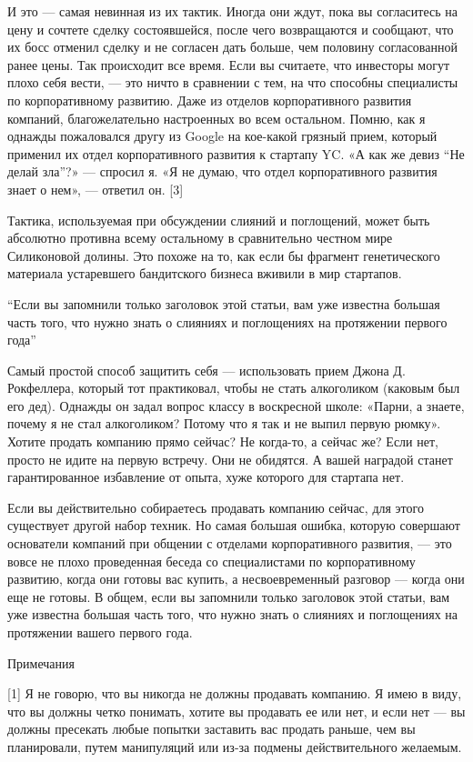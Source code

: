 \documentclass[ebook,12pt,oneside,openany]{memoir}
\begin{document}
И это — самая невинная из их тактик. Иногда они ждут, пока вы
согласитесь на цену и сочтете сделку состоявшейся, после чего
возвращаются и сообщают, что их босс отменил сделку и не согласен дать
больше, чем половину согласованной ранее цены. Так происходит все
время. Если вы считаете, что инвесторы могут плохо себя вести, — это
ничто в сравнении с тем, на что способны специалисты по корпоративному
развитию. Даже из отделов корпоративного развития компаний,
благожелательно настроенных во всем остальном. Помню, как я однажды
пожаловался другу из Google на кое-какой грязный прием, который
применил их отдел корпоративного развития к стартапу YC. «А как же
девиз “Не делай зла”?» — спросил я. «Я не думаю, что отдел
корпоративного развития знает о нем», — ответил он. [3]

Тактика, используемая при обсуждении слияний и поглощений, может быть
абсолютно противна всему остальному в сравнительно честном мире
Силиконовой долины. Это похоже на то, как если бы фрагмент
генетического материала устаревшего бандитского бизнеса вживили в мир
стартапов.

“Если вы запомнили только заголовок этой статьи, вам уже известна
большая часть того, что нужно знать о слияниях и поглощениях на
протяжении первого года”

Самый простой способ защитить себя — использовать прием Джона Д.
Рокфеллера, который тот практиковал, чтобы не стать алкоголиком
(каковым был его дед). Однажды он задал вопрос классу в воскресной
школе: «Парни, а знаете, почему я не стал алкоголиком? Потому что я
так и не выпил первую рюмку». Хотите продать компанию прямо сейчас? Не
когда-то, а сейчас же? Если нет, просто не идите на первую встречу.
Они не обидятся. А вашей наградой станет гарантированное избавление от
опыта, хуже которого для стартапа нет.

Если вы действительно собираетесь продавать компанию сейчас, для этого
существует другой набор техник. Но самая большая ошибка, которую
совершают основатели компаний при общении с отделами корпоративного
развития, — это вовсе не плохо проведенная беседа со специалистами по
корпоративному развитию, когда они готовы вас купить, а
несвоевременный разговор — когда они еще не готовы. В общем, если вы
запомнили только заголовок этой статьи, вам уже известна большая часть
того, что нужно знать о слияниях и поглощениях на протяжении вашего
первого года.

Примечания

[1] Я не говорю, что вы никогда не должны продавать компанию. Я имею в
виду, что вы должны четко понимать, хотите вы продавать ее или нет, и
если нет — вы должны пресекать любые попытки заставить вас продать
раньше, чем вы планировали, путем манипуляций или из-за подмены
действительного желаемым.
\end{document}

